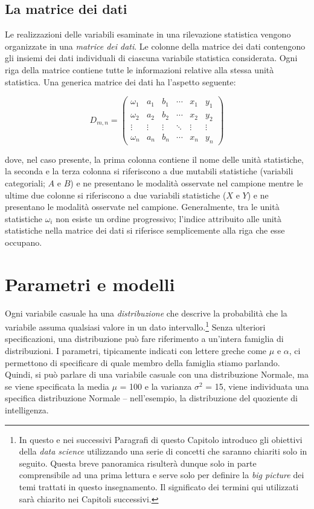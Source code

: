 \documentclass[
  11pt,
]{krantz}
\theoremstyle{definition}
\theoremstyle{definition}
\theoremstyle{definition}
\theoremstyle{definition}
\theoremstyle{remark}
\begin{document}
\hypertarget{la-matrice-dei-dati}{%
\subsection{La matrice dei dati}\label{la-matrice-dei-dati}}

Le realizzazioni delle variabili esaminate in una rilevazione statistica vengono organizzate in una \emph{matrice dei dati}. Le colonne della matrice dei dati contengono gli insiemi dei dati individuali di ciascuna variabile statistica considerata. Ogni riga della matrice contiene tutte le informazioni relative alla stessa unità statistica. Una generica matrice dei dati ha l'aspetto seguente:

\[
D_{m,n} = 
 \begin{pmatrix}
  \omega_1 & a_{1}   & b_{1}   & \cdots & x_{1} & y_{1}\\
  \omega_2 & a_{2}   & b_{2}   & \cdots & x_{2} & y_{2}\\
  \vdots   & \vdots  & \vdots  & \ddots & \vdots & \vdots  \\
 \omega_n  & a_{n}   & b_{n}   & \cdots & x_{n} & y_{n}
 \end{pmatrix}
 \]

\noindent dove, nel caso presente, la prima colonna contiene il nome delle unità statistiche, la seconda e la terza colonna si riferiscono a due mutabili statistiche (variabili categoriali; \(A\) e \(B\)) e ne presentano le modalità osservate nel campione mentre le ultime due colonne si riferiscono a due variabili statistiche (\(X\) e \(Y\)) e ne presentano le modalità osservate nel campione. Generalmente, tra le unità statistiche \(\omega_i\) non esiste un ordine progressivo; l'indice attribuito alle unità statistiche nella matrice dei dati si riferisce semplicemente alla riga che esse occupano.

\hypertarget{parametri-e-modelli}{%
\section{Parametri e modelli}\label{parametri-e-modelli}}

Ogni variabile casuale ha una \emph{distribuzione} che descrive la probabilità che la variabile assuma qualsiasi valore in un dato intervallo.\footnote{In questo e nei successivi Paragrafi di questo Capitolo introduco gli obiettivi della \emph{data science} utilizzando una serie di concetti che saranno chiariti solo in seguito. Questa breve panoramica risulterà dunque solo in parte comprensibile ad una prima lettura e serve solo per definire la \emph{big picture} dei temi trattati in questo insegnamento. Il significato dei termini qui utilizzati sarà chiarito nei Capitoli successivi.} Senza ulteriori specificazioni, una distribuzione può fare riferimento a un'intera famiglia di distribuzioni. I parametri, tipicamente indicati con lettere greche come \(\mu\) e \(\alpha\), ci permettono di specificare di quale membro della famiglia stiamo parlando. Quindi, si può parlare di una variabile casuale con una distribuzione Normale, ma se viene specificata la media \(\mu\) = 100 e la varianza \(\sigma^2\) = 15, viene individuata una specifica distribuzione Normale -- nell'esempio, la distribuzione del quoziente di intelligenza.
\end{document}
